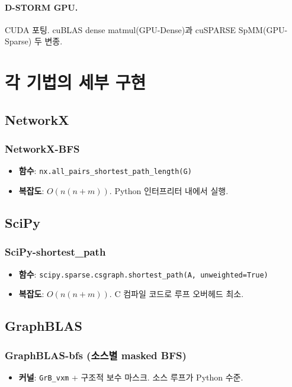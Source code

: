 \documentclass[11pt,a4paper]{article}
\begin{document}
\paragraph{D-STORM GPU.} CUDA 포팅. cuBLAS dense matmul(GPU-Dense)과 cuSPARSE SpMM(GPU-Sparse) 두 변종.

\section{각 기법의 세부 구현}

\subsection{NetworkX}
\subsubsection{NetworkX-BFS}
\begin{itemize}[leftmargin=1.4em]
  \item \textbf{함수}: \texttt{nx.all\_pairs\_shortest\_path\_length(G)}
  \item \textbf{복잡도}: $O(n(n+m))$. Python 인터프리터 내에서 실행.
\end{itemize}

\subsection{SciPy}
\subsubsection{SciPy-shortest\_path}
\begin{itemize}[leftmargin=1.4em]
  \item \textbf{함수}: \texttt{scipy.sparse.csgraph.shortest\_path(A, unweighted=True)}
  \item \textbf{복잡도}: $O(n(n+m))$. C 컴파일 코드로 루프 오버헤드 최소.
\end{itemize}

\subsection{GraphBLAS}
\subsubsection{GraphBLAS-bfs (소스별 masked BFS)}
\begin{itemize}[leftmargin=1.4em]
  \item \textbf{커널}: \texttt{GrB\_vxm} + 구조적 보수 마스크. 소스 루프가 Python 수준.
\end{itemize}
\end{document}
